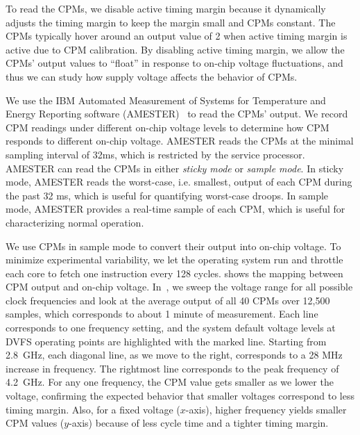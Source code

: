 To read the CPMs, we disable active timing margin because it dynamically adjusts the timing margin to keep the margin small and CPMs constant. The CPMs typically hover around an output value of 2 when active timing margin is active due to CPM calibration. By disabling active timing margin, we allow the CPMs' output values to ``float'' in response to on-chip voltage fluctuations, and thus we can study how supply voltage affects the behavior of CPMs. 

We use the IBM Automated Measurement of Systems for Temperature and Energy Reporting software (AMESTER)~\cite{floyd2011introducing} to read the CPMs' output. We record CPM readings under different on-chip voltage levels to determine how CPM responds to different on-chip voltage. AMESTER reads the CPMs at the minimal sampling interval of 32ms, which is restricted by the service processor. AMESTER can read the CPMs in either {\it sticky mode} or {\it sample mode}. In sticky mode, AMESTER reads the worst-case, i.e. smallest, output of each CPM during the past 32 ms, which is useful for quantifying worst-case droops. In sample mode, AMESTER provides a real-time sample of each CPM, which is useful for characterizing normal operation.

We use CPMs in sample mode to convert their output into on-chip voltage. To minimize experimental variability, we let the operating system run and throttle each core to fetch one instruction every 128 cycles.  shows the mapping between CPM output and on-chip voltage. In~, we sweep the voltage range for all possible clock frequencies and look at the average output of all 40 CPMs over 12,500 samples, which corresponds to about 1 minute of measurement. Each line corresponds to one frequency setting, and the system default voltage levels at DVFS operating points are highlighted with the marked line. Starting from 2.8~GHz, each diagonal line, as we move to the right, corresponds to a 28 MHz increase in frequency. The rightmost line corresponds to the peak frequency of 4.2~GHz. For any one frequency, the CPM value gets smaller as we lower the voltage, confirming the expected behavior that smaller voltages correspond to less timing margin. Also, for a fixed voltage ($x$-axis), higher frequency yields smaller CPM values ($y$-axis) because of less cycle time and a tighter timing margin. 

